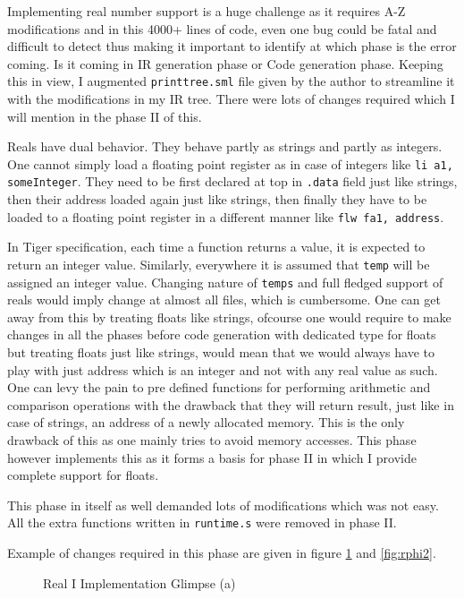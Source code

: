 Implementing real number support is a huge challenge as it requires A-Z modifications and in this 4000+ lines of code, even one bug could be fatal and difficult to detect thus making it important to identify at which phase is the error coming. Is it coming in IR generation phase or Code generation phase. Keeping this in view, I augmented \texttt{printtree.sml} file given by the author to streamline it with the modifications in my IR tree. There were lots of changes required which I will mention in the phase II of this.

Reals have dual behavior. They behave partly as strings and partly as integers. One cannot simply load a floating point register as in case of integers like \texttt{li a1, someInteger}. They need to be first declared at top in \texttt{.data} field just like strings, then their address loaded again just like strings, then finally they have to be loaded to a floating point register in a different manner like \texttt{flw fa1, address}.

In Tiger specification, each time a function returns a value, it is expected to return an integer value. Similarly, everywhere it is assumed that \texttt{temp} will be assigned an integer value. Changing nature of \texttt{temps} and full fledged support of reals would imply change at almost all files, which is cumbersome. One can get away from this by treating floats like strings, ofcourse one would require to make changes in all the phases before code generation with dedicated type for floats but treating floats just like strings, would mean that we would always have to play with just address which is an integer and not with any real value as such. One can levy the pain to pre defined functions for performing arithmetic and comparison operations with the drawback that they will return result, just like in case of strings, an address of a newly allocated memory. This is the only drawback of this as one mainly tries to avoid memory accesses. This phase however implements this as it forms a basis for phase II in which I provide complete support for floats.

This phase in itself as well demanded lots of modifications which was not easy. All the extra functions written in \texttt{runtime.s} were removed in phase II.

Example of changes required in this phase are given in figure \ref{fig:rphi1} and \ref{fig:rphi2}.

\begin{figure}
	\centering
	\caption{Real I Implementation Glimpse (a)}
	\label{fig:rphi1}
\end{figure}

